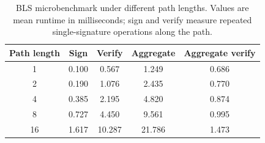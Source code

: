 \begin{table}[t]
\centering
\caption{BLS microbenchmark under different path lengths. Values are mean runtime in milliseconds; sign and verify measure repeated single-signature operations along the path.}
\label{tab:crypto_overhead}
\begin{tabular}{c|c|c|c|c}
\hline
Path length & Sign & Verify & Aggregate & Aggregate verify \\
\hline
1  & 0.100 & 0.567  & 1.249  & 0.686 \\
2  & 0.190 & 1.076  & 2.435  & 0.770 \\
4  & 0.385 & 2.195  & 4.820  & 0.874 \\
8  & 0.727 & 4.450  & 9.561  & 0.995 \\
16 & 1.617 & 10.287 & 21.786 & 1.473 \\
\hline
\end{tabular}
\end{table}
